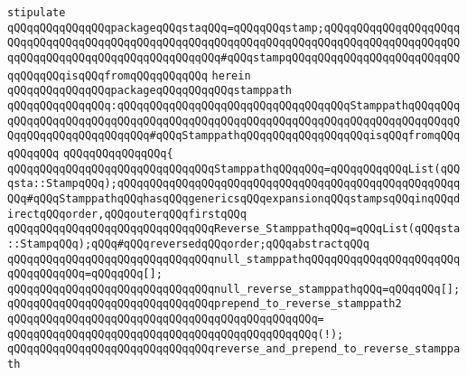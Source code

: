 \verb|stipulate|\newline
\verb|qQQqqQQqqQQqqQQqpackageqQQqstaqQQq=qQQqqQQqstamp;qQQqqQQqqQQqqQQqqQQqqQQqqQQqqQQqqQQqqQQqqQQqqQQqqQQqqQQqqQQqqQQqqQQqqQQqqQQqqQQqqQQqqQQqqQQqqQQqqQQqqQQqqQQqqQQqqQQqqQQqqQQq#qQQqstampqQQqqQQqqQQqqQQqqQQqqQQqqQQqqQQqqQQqisqQQqfromqQQqqQQqqQQq|\newline
\verb|herein|\newline
\newline
\newline
\verb|qQQqqQQqqQQqqQQqpackageqQQqqQQqqQQqstamppath|\newline
\verb|qQQqqQQqqQQqqQQq:qQQqqQQqqQQqqQQqqQQqqQQqqQQqqQQqqQQqStamppathqQQqqQQqqQQqqQQqqQQqqQQqqQQqqQQqqQQqqQQqqQQqqQQqqQQqqQQqqQQqqQQqqQQqqQQqqQQqqQQqqQQqqQQqqQQqqQQqqQQq#qQQqStamppathqQQqqQQqqQQqqQQqqQQqisqQQqfromqQQqqQQqqQQq|\newline
\verb|qQQqqQQqqQQqqQQq{|\newline
\verb|qQQqqQQqqQQqqQQqqQQqqQQqqQQqqQQqStamppathqQQqqQQq=qQQqqQQqqQQqList(qQQqsta::StampqQQq);qQQqqQQqqQQqqQQqqQQqqQQqqQQqqQQqqQQqqQQqqQQqqQQqqQQqqQQq#qQQqStamppathqQQqhasqQQqgenericsqQQqexpansionqQQqstampsqQQqinqQQqdirectqQQqorder,qQQqouterqQQqfirstqQQq|\newline
\newline
\verb|qQQqqQQqqQQqqQQqqQQqqQQqqQQqqQQqReverse_StamppathqQQq=qQQqList(qQQqsta::StampqQQq);qQQq#qQQqreversedqQQqorder;qQQqabstractqQQq|\newline
\newline
\verb|qQQqqQQqqQQqqQQqqQQqqQQqqQQqqQQqnull_stamppathqQQqqQQqqQQqqQQqqQQqqQQqqQQqqQQqqQQq=qQQqqQQq[];|\newline
\verb|qQQqqQQqqQQqqQQqqQQqqQQqqQQqqQQqnull_reverse_stamppathqQQq=qQQqqQQq[];|\newline
\newline
\verb|qQQqqQQqqQQqqQQqqQQqqQQqqQQqqQQqprepend_to_reverse_stamppath2|\newline
\verb|qQQqqQQqqQQqqQQqqQQqqQQqqQQqqQQqqQQqqQQqqQQqqQQq=|\newline
\verb|qQQqqQQqqQQqqQQqqQQqqQQqqQQqqQQqqQQqqQQqqQQqqQQq(!);|\newline
\newline
\newline
\verb|qQQqqQQqqQQqqQQqqQQqqQQqqQQqqQQqreverse_and_prepend_to_reverse_stamppath|\newline
